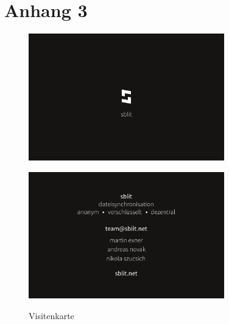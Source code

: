 \documentclass[a4paper,ngerman,naustrian,DIV=12,BCOR=1cm]{scrbook}
\begin{document}
\chapter{Anhang 3\label{appendix3}}
\begin{figure}[htb]
   \centering
  \includegraphics[width=85mm,height=55mm]{images/visitenkarte_vorderseite.pdf}
      \\
     \vspace{5mm}

\includegraphics[width=85mm,height=55mm]{images/visitenkarte_rueckseite.pdf}
          \label{visitenkarte_rueckseite}
    \caption{Visitenkarte}
\end{figure}

\printindex{}




\printglossary[type=\acronymtype]
\printglossary
\end{document}
